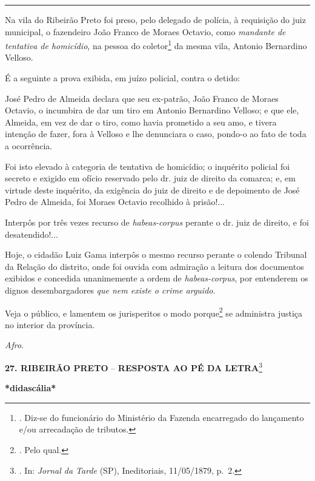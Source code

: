 \begin{center}\rule{0.5\linewidth}{\linethickness}\end{center}

Na vila do Ribeirão Preto foi preso, pelo delegado de polícia, à
requisição do juiz municipal, o fazendeiro João Franco de Moraes
Octavio, como \emph{mandante de tentativa de homicídio}, na pessoa do
coletor\footnote{. Diz-se do funcionário do Ministério da Fazenda
  encarregado do lançamento e/ou arrecadação de tributos.} da mesma
vila, Antonio Bernardino Velloso.

É a seguinte a prova exibida, em juízo policial, contra o detido:

José Pedro de Almeida declara que seu ex-patrão, João Franco de Moraes
Octavio, o incumbira de dar um tiro em Antonio Bernardino Velloso; e que
ele, Almeida, em vez de dar o tiro, como havia prometido a seu amo, e
tivera intenção de fazer, fora à Velloso e lhe denunciara o caso,
pondo-o ao fato de toda a ocorrência.

Foi isto elevado à categoria de tentativa de homicídio; o inquérito
policial foi secreto e exigido em ofício reservado pelo dr. juiz de
direito da comarca; e, em virtude deste inquérito, da exigência do juiz
de direito e de depoimento de José Pedro de Almeida, foi Moraes Octavio
recolhido à prisão!...

Interpôs por três vezes recurso de \emph{habeas-corpus} perante o dr.
juiz de direito, e foi desatendido!...

Hoje, o cidadão Luiz Gama interpôs o mesmo recurso perante o colendo
Tribunal da Relação do distrito, onde foi ouvida com admiração a leitura
dos documentos exibidos e concedida unanimemente a ordem de
\emph{habeas-corpus}, por entenderem os dignos desembargadores \emph{que
nem existe o crime arguido}.

Veja o público, e lamentem os jurisperitos o modo porque\footnote{. Pelo
  qual.} se administra justiça no interior da província.

\emph{Afro}.

\textbf{27. RIBEIRÃO PRETO} -- \textbf{RESPOSTA AO PÉ DA
LETRA}\footnote{. In: \emph{Jornal da Tarde} (SP), Ineditoriais,
  11/05/1879, p.~2.}

\textbf{*didascália*}

